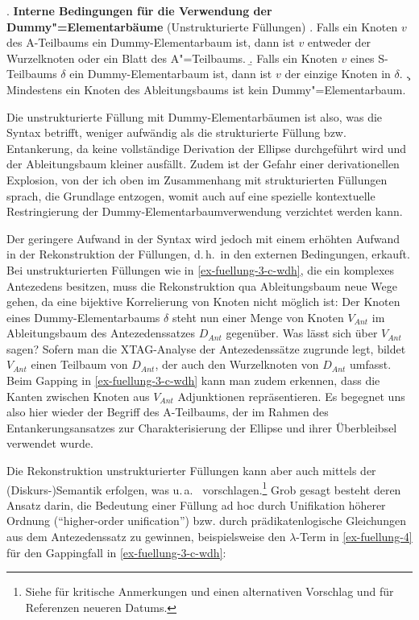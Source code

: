 \ex. {\bf Interne Bedingungen für die Verwendung der Dummy"=Elementarbäume} (Unstrukturierte Füllungen) \label{ex-fuellung-interne-bedingungen-2}
\a. Falls ein Knoten $v$ des A-Teilbaums ein Dummy-Elementarbaum ist, dann ist $v$ entweder der Wurzelknoten oder ein Blatt des A"=Teilbaums.
\b. Falls ein Knoten $v$ eines S-Teilbaums $\delta$ ein Dummy-Elementarbaum ist, dann ist $v$ der einzige Knoten in $\delta$.
\c. Mindestens ein Knoten des Ableitungsbaums ist kein Dummy"=Elementarbaum.

Die unstrukturierte Füllung mit Dummy-Elementarbäumen ist also, was die Syntax betrifft, weniger aufwändig als die strukturierte Füllung bzw. Entankerung, da keine vollständige Derivation der Ellipse durchgeführt wird und der Ableitungsbaum kleiner ausfällt. Zudem ist der Gefahr einer derivationellen Explosion, von der ich oben im Zusammenhang mit strukturierten Füllungen sprach, die Grundlage entzogen, womit auch auf eine spezielle kontextuelle Restringierung der Dummy-Elementarbaumverwendung verzichtet werden kann.

Der geringere Aufwand in der Syntax wird jedoch mit einem erhöhten Aufwand in der Rekonstruktion der Füllungen, d.\,h.\ in den externen Bedingungen, erkauft. Bei unstrukturierten Füllungen wie in \ref{ex-fuellung-3-c-wdh}, die ein komplexes Antezedens besitzen, muss die Rekonstruktion qua Ableitungsbaum neue Wege gehen, da eine bijektive Korrelierung von Knoten nicht möglich ist: Der Knoten eines Dummy-Elementarbaums $\delta$ steht nun einer Menge von Knoten $V_{Ant}$ im Ableitungsbaum des Antezedenssatzes $D_{Ant}$ gegenüber. Was lässt sich über $V_{Ant}$ sagen? Sofern man die XTAG-Analyse der Antezedenssätze zugrunde legt, bildet $V_{Ant}$ einen Teilbaum von $D_{Ant}$, der auch den Wurzelknoten von $D_{Ant}$ umfasst. Beim Gapping in \ref{ex-fuellung-3-c-wdh} kann man zudem erkennen, dass die Kanten zwischen Knoten aus $V_{Ant}$ Adjunktionen repräsentieren. Es begegnet uns also hier wieder der Begriff des A-Teilbaums, der im Rahmen des Entankerungsansatzes zur Charakterisierung der Ellipse und ihrer Überbleibsel verwendet wurde. 

Die Rekonstruktion unstrukturierter Füllungen kann aber auch mittels der (Diskurs-)Seman\-tik erfolgen, was u.\,a.\ \cite{Dalrymple:etal:91}  vorschlagen.\footnote{Siehe \citet[68f]{Hardt:93} für kritische Anmerkungen und einen alternativen Vorschlag und \cite{Winkler:Schwabe:03} für Referenzen neueren Datums.} Grob gesagt besteht deren Ansatz darin, die Bedeutung einer Füllung ad hoc durch Unifikation höherer Ordnung ("`higher-order unification"') bzw. durch prädikatenlogische Gleichungen aus dem Antezedenssatz zu gewinnen, beispielsweise den $\lambda$-Term in \ref{ex-fuellung-4} für den Gappingfall in \ref{ex-fuellung-3-c-wdh}:

